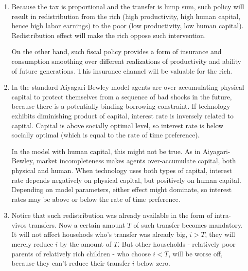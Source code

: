 \documentclass{article}
\begin{document}
\begin{enumerate}
\item Because the tax is proportional and the transfer is lump sum,
  such policy will result in redistribution from the rich (high
  productivity, high human capital, hence high labor earnings) to the
  poor (low productivity, low human capital). Redistribution effect
  will make the rich oppose such intervention.

  On the other hand, such fiscal policy provides a form of insurance
  and consumption smoothing over different realizations of
  productivity and ability of future generations. This insurance
  channel will be valuable for the rich.

\item In the standard Aiyagari-Bewley model agents are
  over-accumulating physical capital to protect themselves from a
  sequence of bad shocks in the future, because there is a potentially
  binding borrowing constraint. If technology exhibits diminishing
  product of capital, interest rate is inversely related to
  capital. Capital is above socially optimal level, so interest rate
  is below socially optimal (which is equal to the rate of time
  preference).

  In the model with human capital, this might not be true. As in
  Aiyagari-Bewley, market incompleteness makes agents over-accumulate
  capital, both physical and human. When technology uses both types of
  capital, interest rate depends negatively on physical capital, but
  positively on human capital. Depending on model parameters, either
  effect might dominate, so interest rates may be above or below the
  rate of time preference.

\item Notice that such redistribution was already available in the
  form of intra-vivos transfers. Now a certain amount $T$ of such
  transfer becomes mandatory. It will not affect househods who's
  transfer was already big, $i>T$, they will merely reduce $i$ by the
  amount of $T$. But other households - relatively poor parents of
  relatively rich children - who choose $i<T$, will be worse off,
  because they can't reduce their transfer $i$ below zero.

\end{enumerate}
\end{document}
